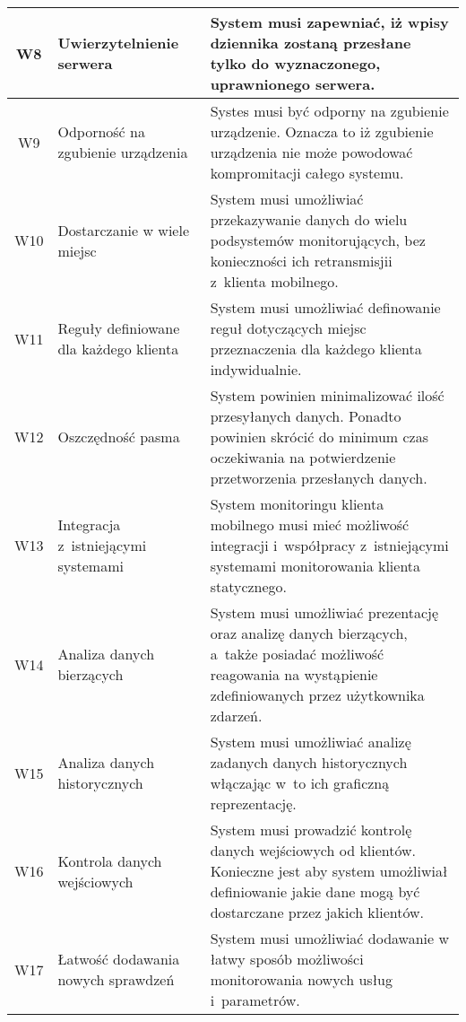 \begin{longtable}[c]{|c||p{3.5cm}|p{9cm}|}
  W8 & \raggedright{Uwierzytelnienie serwera} & \raggedright{System musi zapewniać, iż wpisy dziennika zostaną przesłane tylko do wyznaczonego, uprawnionego serwera.} \tabularnewline
  \hline

  W9 & \raggedright{Odporność na zgubienie urządzenia} & \raggedright{Systes musi być odporny na zgubienie urządzenie. Oznacza to iż zgubienie urządzenia nie może powodować kompromitacji całego systemu.} \tabularnewline
  \hline

  W10 & \raggedright{Dostarczanie w wiele miejsc} & \raggedright{System musi umożliwiać przekazywanie danych do wielu podsystemów monitorujących, bez konieczności ich retransmisjii z~klienta mobilnego.} \tabularnewline
  \hline

  W11 & \raggedright{Reguły definiowane dla każdego klienta} & \raggedright{System musi umożliwiać definowanie reguł dotyczących miejsc przeznaczenia dla każdego klienta indywidualnie.} \tabularnewline
  \hline

  W12 & \raggedright{Oszczędność pasma} & \raggedright{System powinien minimalizować ilość przesyłanych danych. Ponadto powinien skrócić do minimum czas oczekiwania na potwierdzenie przetworzenia przesłanych danych.} \tabularnewline
  \hline

  W13 & \raggedright{Integracja z~istniejącymi systemami} & \raggedright{System monitoringu klienta mobilnego musi mieć możliwość integracji i~współpracy z~istniejącymi systemami monitorowania klienta statycznego.} \tabularnewline
  \hline

  W14 & \raggedright{Analiza danych bierzących} & \raggedright{System musi umożliwiać prezentację oraz analizę danych bierzących, a~także posiadać możliwość reagowania na wystąpienie zdefiniowanych przez użytkownika zdarzeń.} \tabularnewline
  \hline

  W15 & \raggedright{Analiza danych historycznych} & \raggedright{System musi umożliwiać analizę zadanych danych historycznych włączając w~to ich graficzną reprezentację.} \tabularnewline
  \hline

  W16 & \raggedright{Kontrola danych wejściowych} & \raggedright{System musi prowadzić kontrolę danych wejściowych od klientów. Konieczne jest aby system umożliwiał definiowanie jakie dane mogą być dostarczane przez jakich klientów.} \tabularnewline
  \hline

  W17 & \raggedright{Łatwość dodawania nowych sprawdzeń} & \raggedright{System musi umożliwiać dodawanie w łatwy sposób możliwości monitorowania nowych usług i~parametrów.} \tabularnewline
  \hline


\end{longtable}
